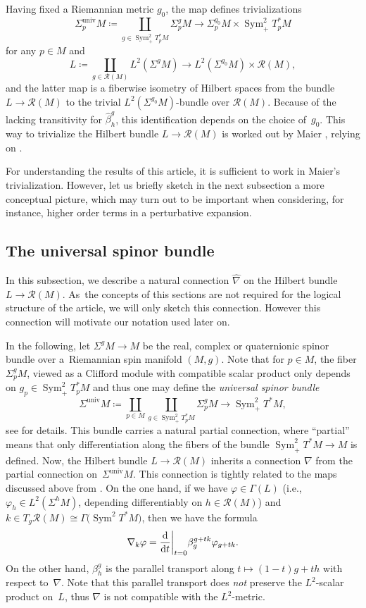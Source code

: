 \documentclass[11pt]{article}
\numberwithin{equation}{section}
\def\phi{{\varphi}}
\newcommand\ceq{\coloneqq}
\DeclareMathOperator{\univ}{univ}
\newcommand\<{\langle}
\renewcommand\>{\rangle}
\newcommand\Sym[1][2]{\mathop{\mathrm{Sym}}\nolimits^{#1}}
\newcommand{\maR}{\mathcal R}
\theoremstyle{definition}
\let\define\emph
\newcommand\ie{i.e.,\ \ignorespaces}
\newcommand\={\,=\,}
\numberwithin{equation}{section}
\begin{document}
Having fixed a Riemannian metric $g_0$, the map  defines trivializations
\[
\Sigma^{\univ}_p M\ceq \coprod_{g\in \Sym_+T^*_pM }\Sigma^g_p M\to \Sigma^{g_0}_p M\times \Sym_+T^*_pM
\]
for any $p\in M$ and
\[
L\ceq \coprod_{g\in \maR(M)}L^2(\Sigma^g M)\to L^2(\Sigma^{g_0}M)\times \maR(M),
\]
and the latter map is a fiberwise isometry of Hilbert spaces from the bundle $L\to \maR(M)$ to the trivial $L^2(\Sigma^{g_0}M)$-bundle over $\maR(M)$.
Because of the lacking transitivity for $\hat\beta^g_h$, this identification depends on the choice of~$g_0$. This way to trivialize the Hilbert bundle $L\to \maR(M)$ is worked out by Maier \cite{maier:97}, relying on \cite{bourguignon.gauduchon:92}.

For understanding the results of this article, it is sufficient to work in Maier's trivialization.
However, let us briefly sketch in the next subsection a more conceptual picture,
which may turn out to be important when considering, for instance,
higher order terms in a perturbative expansion.

\subsection{The universal spinor bundle}

In this subsection, we describe a natural connection $\hat\nabla$ on the Hilbert bundle $L\to \maR(M)$. As~the concepts of this sections are not required for the logical structure of the article, we will only sketch this connection. However this connection will motivate our notation used later on.

In the following, let $\Sigma^g M\to M$ be the real, complex or quaternionic spinor bundle over a~Riemannian spin manifold $(M,g)$.
Note that for $p\in M$, the fiber $\Sigma^g_p M$, viewed as a Clifford module with compatible scalar product only depends on $g_p\in \Sym_+T^*_pM$ and thus one may define the \define{universal spinor bundle}
\[\Sigma^{\univ} M\ceq\coprod_{p\in M}\coprod_{g\in \Sym_+T^*_pM }\Sigma^g_p M\to \Sym_+ T^*M ,\]
see \cite{ammann.weiss.witt.math.ann:2016,ammann.weiss.witt.math.z:2016,mueller.nowaczyk:2017} for details.
This bundle carries a natural partial connection, where ``partial'' means that only differentiation along the fibers of the bundle $\Sym_+ T^*M\to M$ is defined. Now, the Hilbert bundle $L\to \maR(M)$ inherits a connection $\nabla$ from the partial connection on~$\Sigma^{\univ} M$. This connection is tightly related to the maps  discussed above from \cite{bourguignon.gauduchon:92}.
On the one hand, if we have $\phi\in \Gamma(L)$ \big(\ie $\phi_h\in L^2(\Sigma^h M)$, depending differentiably on $h\in \maR(M)$\big) and ${k\in T_g\maR(M)\cong \Gamma\big(\Sym T^*M\big)}$, then we have the formula
\[
\nabla_k\phi=\frac{{\rm d}}{{\rm d}t}\bigg|_{t=0}\beta^{g+tk}_g\phi_{g+tk} .
\]
On the other hand, $\beta^g_h$ is the parallel transport along $t\mapsto (1-t)g+th$ with respect to~$\nabla$.
Note that this parallel transport does \emph{not} preserve the $L^2$-scalar product on~$L$,
thus $\nabla$ is not compatible with the $L^2$-metric.
\end{document}
